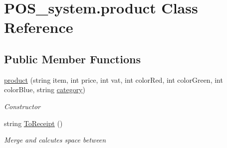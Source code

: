 \hypertarget{class_p_o_s__system_1_1product}{}\section{P\+O\+S\+\_\+system.\+product Class Reference}
\label{class_p_o_s__system_1_1product}
\subsection*{Public Member Functions}
\begin{DoxyCompactItemize}
\item 
\mbox{\hyperlink{class_p_o_s__system_1_1product_ac8d8714ab7ef48ea39fc809cfd7d1dd2}{product}} (string item, int price, int vat, int color\+Red, int color\+Green, int color\+Blue, string \mbox{\hyperlink{class_p_o_s__system_1_1category}{category}})
\begin{DoxyCompactList}\small\item\em Constructor \end{DoxyCompactList}\item 
string \mbox{\hyperlink{class_p_o_s__system_1_1product_a17b6ab9a655cc4ade440d0ed06f08c5b}{To\+Receipt}} ()
\begin{DoxyCompactList}\small\item\em Merge and calcutes space between \end{DoxyCompactList}\end{DoxyCompactItemize}
